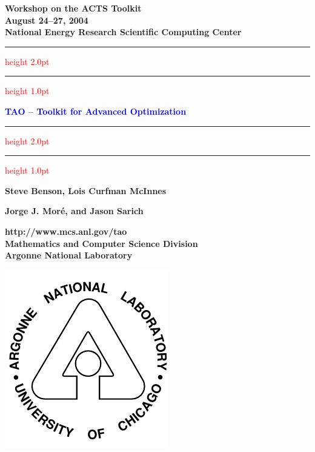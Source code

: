 \documentclass{seminar}
\newcommand{\redstripe}{\textcolor{red}{\hrule height 2.0pt\hfil}
             \vspace{-1.8pt}
             \textcolor{red}{\hrule height 1.0pt\hfil}
}
\begin{document}
\begin{slide}

\begin{center}
{\bf
Workshop on the ACTS Toolkit \\
August 24--27, 2004 \\
National Energy Research Scientific Computing Center
}
\end{center}

\redstripe

\begin{center}
{\bf
\textcolor{blue}{TAO -- Toolkit for Advanced Optimization}
}

\redstripe

\medskip

\centerline{\bf Steve Benson, Lois Curfman McInnes} 
\centerline{\bf Jorge J. Mor\'e, and Jason Sarich}

\end{center}


\parbox[b]{3in}{\bf http://www.mcs.anl.gov/tao \bigskip \\
\small  Mathematics and Computer Science Division \\ 
Argonne National Laboratory} \includegraphics[scale=0.5]{../images//argonne}

\end{slide}
\end{document}
